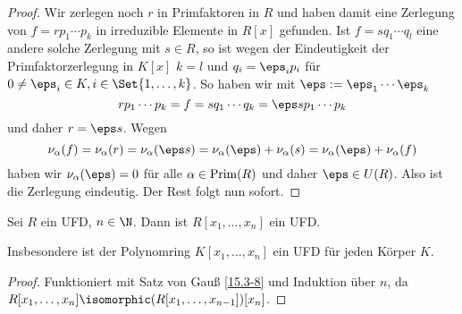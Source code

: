 \begin{st}
\begin{proof}
		Wir zerlegen noch $r$ in Primfaktoren in $R$ und haben damit eine Zerlegung von $f = rp_1\dotsb p_k$ in irreduzible Elemente in $R[x]$ gefunden.
		Ist $f = s q_1 \dotsb q_l$ eine andere solche Zerlegung mit $s \in R$, so ist wegen der Eindeutigkeit der Primfaktorzerlegung in $K[x]$ $k = l$ und $q_i = \eps_i p_i$ für $0 \neq \eps_i \in  K, i \in \Set{1,\dotsc, k}$.
		So haben wir mit $\eps := \eps_1 \dotsb \eps_k$
		\[
			r p_1 \dotsb p_k
			= f
			= s q_1 \dotsb q_k
			= \eps s p_1 \dotsb p_k
		\]
		und daher $r = \eps s$.
		Wegen
		\[
			\nu_\alpha(f)
			= \nu_\alpha(r)
			= \nu_\alpha(\eps s)
			= \nu_\alpha(\eps) + \nu_\alpha(s)
			= \nu_\alpha(\eps) + \nu_\alpha(f)
		\]
		haben wir $\nu_\alpha(\eps) = 0$ für alle $\alpha \in \operatorname{Prim}(R)$ und daher $\eps \in U(R)$.
		Also ist die Zerlegung eindeutig.
		Der Rest folgt nun sofort.
	\end{proof}
\end{st}

\begin{kor} \label{15.3-9}
	Sei $R$ ein UFD, $n \in \N$.
	Dann ist $R[x_1, \dotsc, x_n]$ ein UFD.

	Insbesondere ist der Polynomring $K[x_1, \dotsc, x_n]$ ein UFD für jeden Körper $K$.
	\begin{proof}
		Funktioniert mit Satz von Gauß \ref{15.3-8} und Induktion über $n$, da $R[x_1, \dotsc, x_n] \isomorphic (R[x_1, \dotsc, x_{n-1}])[x_n]$.
	\end{proof}
\end{kor}

